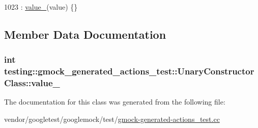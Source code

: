 \begin{DoxyCode}
1023 : \hyperlink{classtesting_1_1gmock__generated__actions__test_1_1UnaryConstructorClass_a5e96ce337c5eb7016eba2ea66ae46851}{value\_}(value) \{\}
\end{DoxyCode}


\subsection{Member Data Documentation}
\subsubsection[{\texorpdfstring{value\+\_\+}{value_}}]{\setlength{\rightskip}{0pt plus 5cm}int testing\+::gmock\+\_\+generated\+\_\+actions\+\_\+test\+::\+Unary\+Constructor\+Class\+::value\+\_\+}\hypertarget{classtesting_1_1gmock__generated__actions__test_1_1UnaryConstructorClass_a5e96ce337c5eb7016eba2ea66ae46851}{}\label{classtesting_1_1gmock__generated__actions__test_1_1UnaryConstructorClass_a5e96ce337c5eb7016eba2ea66ae46851}


The documentation for this class was generated from the following file\+:\begin{DoxyCompactItemize}
\item 
vendor/googletest/googlemock/test/\hyperlink{gmock-generated-actions__test_8cc}{gmock-\/generated-\/actions\+\_\+test.\+cc}\end{DoxyCompactItemize}
